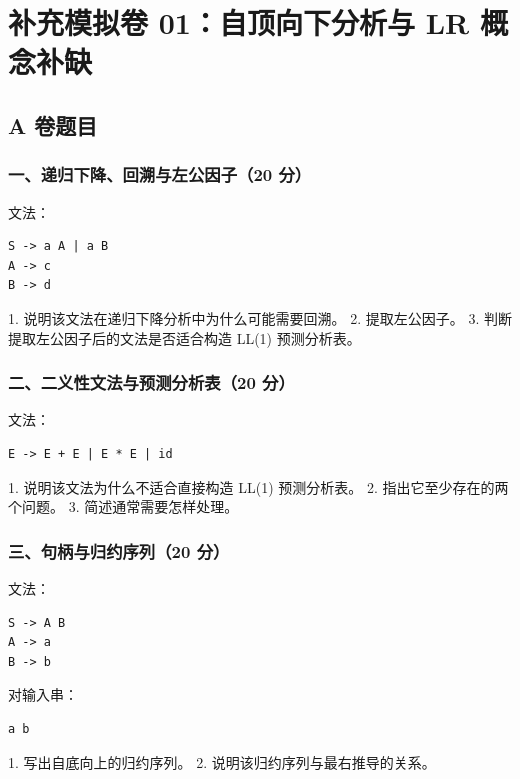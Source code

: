 \documentclass[UTF8]{ctexart}
\begin{document}
\section*{补充模拟卷 01：自顶向下分析与 LR 概念补缺}

\subsection*{A 卷题目}

\subsubsection*{一、递归下降、回溯与左公因子（20 分）}

文法：

\begin{Verbatim}[fontsize=\small,breaklines=true]
S -> a A | a B
A -> c
B -> d
\end{Verbatim}

1. 说明该文法在递归下降分析中为什么可能需要回溯。 2. 提取左公因子。 3. 判断提取左公因子后的文法是否适合构造 LL(1) 预测分析表。

\subsubsection*{二、二义性文法与预测分析表（20 分）}

文法：

\begin{Verbatim}[fontsize=\small,breaklines=true]
E -> E + E | E * E | id
\end{Verbatim}

1. 说明该文法为什么不适合直接构造 LL(1) 预测分析表。 2. 指出它至少存在的两个问题。 3. 简述通常需要怎样处理。

\subsubsection*{三、句柄与归约序列（20 分）}

文法：

\begin{Verbatim}[fontsize=\small,breaklines=true]
S -> A B
A -> a
B -> b
\end{Verbatim}

对输入串：

\begin{Verbatim}[fontsize=\small,breaklines=true]
a b
\end{Verbatim}

1. 写出自底向上的归约序列。 2. 说明该归约序列与最右推导的关系。
\end{document}
